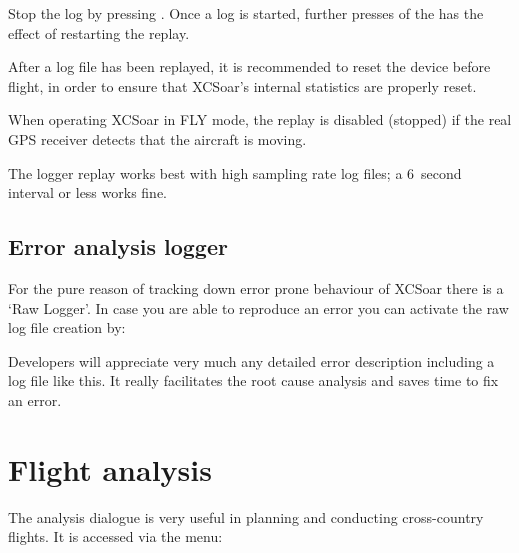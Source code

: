 Stop the log by pressing .
Once a log is started, further presses of the  has the
effect of restarting the replay.

\tip{} After a log file has been replayed, it is recommended to reset
the device before flight, in order to ensure that XCSoar's internal
statistics are properly reset.

When operating XCSoar in FLY mode, the replay is disabled (stopped) if
the real GPS receiver detects that the aircraft is moving.

The logger replay works best with high sampling rate log files;
a 6~second interval or less works fine.

\subsection*{Error analysis logger}\label{sec:raw-logger}
For the pure reason of tracking down error prone behaviour of XCSoar
there is a `Raw Logger'. In case you are able to reproduce an error you can
activate the raw log file creation by:
\begin{quote}
\blink{}
\end{quote}
Developers will appreciate very much any detailed error description including a log file like this. It really facilitates the root cause analysis and saves time to fix an error.

\section{Flight analysis}\label{sec:analysis-climb}

The analysis dialogue is very useful in planning and conducting
cross-country flights.  It is accessed via the menu:  
\begin{quote}
\blink{}
\end{quote}

